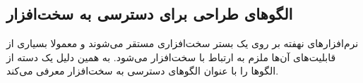\subsection{الگوهای طراحی برای دسترسی به سخت‌افزار}
\begin{RTL}
نرم‌افزارهای نهفته بر روی یک بستر سخت‌افزاری مستقر می‌شوند و معمولا بسیاری از قابلیت‌های
آن‌ها ملزم به ارتباط با سخت‌افزار می‌شود. به همین دلیل 
\cite{ref1} یک دسته از الگوها را با عنوان الگوهای دسترسی به سخت‌افزار
معرفی می‌کند.
\end{RTL}






